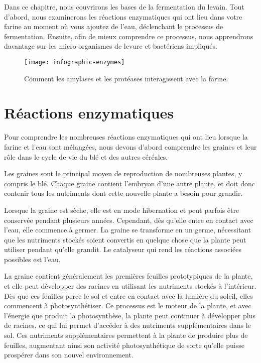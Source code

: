 \begin{quoting}
Dans ce chapitre, nous couvrirons les bases de la fermentation du levain.
Tout d'abord, nous examinerons les réactions enzymatiques qui ont lieu
dans votre farine au moment où vous ajoutez de l'eau, déclenchant le processus de fermentation.
Ensuite, afin de mieux comprendre ce processus, nous 
apprendrons davantage sur les micro-organismes de levure et bactériens impliqués.
\end{quoting}

\begin{figure}[!htb]
  \texttt{[image: infographic-enzymes]}
  \caption[Interaction des amylases et de la farine]{ Comment les amylases et les protéases
      interagissent avec la farine.}%
  \label{infographic-enzymes}
\end{figure}

\section{Réactions enzymatiques}

Pour comprendre les nombreuses réactions enzymatiques qui ont lieu lorsque la farine
et l'eau sont mélangées, nous devons d'abord comprendre les graines et leur rôle dans
le cycle de vie du blé et des autres céréales.

Les graines sont le principal moyen de reproduction de nombreuses plantes, y compris le blé.
Chaque graine contient l'embryon d'une autre plante, et doit
donc contenir tous les nutriments dont cette nouvelle plante a besoin pour grandir.

Lorsque la graine est sèche, elle est en mode hibernation et peut parfois être
conservée pendant plusieurs années. Cependant, dès qu'elle entre en contact avec l'eau,
elle commence à germer. La graine se transforme en un germe, nécessitant que les
nutriments stockés soient convertis en quelque chose que la plante peut utiliser pendant
qu'elle grandit. Le catalyseur qui rend les réactions associées possibles est l'eau.

La graine contient généralement les premières feuilles prototypiques de la plante,
et elle peut développer des racines en utilisant les nutriments stockés à l'intérieur. Dès que ces feuilles
perce le sol et entre en contact avec la lumière du soleil, elles
commencent à photosynthétiser. Ce processus est le moteur de la plante, et avec l'énergie que produit la photosynthèse, la plante peut continuer à développer plus de racines,
ce qui lui permet d'accéder à des nutriments supplémentaires dans le sol. Ces nutriments supplémentaires permettent à la plante de produire plus de feuilles, augmentant ainsi son activité photosynthétique de sorte qu'elle puisse prospérer dans son nouvel environnement.

